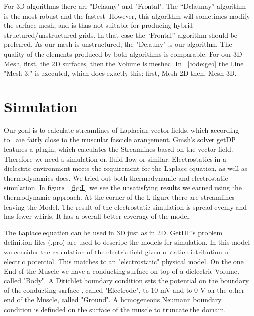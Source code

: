 \documentclass[preprint,journal]{vgtc}       %
\begin{document}
For 3D algorithms there are "Delauny" and "Frontal". 
The “Delaunay” algorithm is the most robust and the fastest. 
However, this algorithm will sometimes modify the surface mesh, and is thus not suitable for producing hybrid structured/unstructured grids.
In that case the “Frontal” algorithm should be preferred. 
As our mesh is unstructured, the "Delauny" is our algorithm. 
The quality of the elements produced by both algorithms is comparable.
For our 3D Mesh, first, the 2D surfaces, then the Volume is meshed. In ~\ref{code:geo} the Line "Mesh 3;" is executed, which does exactly this: first, Mesh 2D then, Mesh 3D.
%	

\section{Simulation}
Our goal is to calculate streamlines of Laplacian vector fields, which according to~\cite{Choi2013} are fairly close to the muscular fascicle arangement. %
Gmsh's solver getDP features a plugin, which calculates the Streamlines based on the vector field. 
Therefore we need a simulation on fluid flow or similar. %
Electrostatics in a dielectric environment meets the requirement for the Laplace equation, as well as thermodynamics does.
We tried out both thermodynamic and electrostatic simulation. 
In figure ~\ref{fig:L} we see the unsatisfying results we earned using the thermodynamic approach. 
At the corner of the L-figure there are streamlines leaving the Model. 
The result of the electrostatic simulation is spread evenly and has fewer whirls. 
It has a overall better coverage of the model.

The Laplace equation can be used in 3D just as in 2D. 
GetDP's problem definition files (.pro) are used to descripe the models for simulation. 
In this model we consider the calculation of the electric field given a static distribution of electric potentiol. 
This matches to an "electrostatic" physical model. 
On the one End of the Muscle we have a conducting surface on top of a dielectric Volume, called "Body".
A Dirichlet boundary condition sets the potential on the boundary of the conducting surface , called "Electrode", to 10 mV and to 0 V on the other end of the Muscle, called "Ground".
A homogeneous Neumann boundary condition is definded on the surface of the muscle to truncate the domain.
\end{document}
